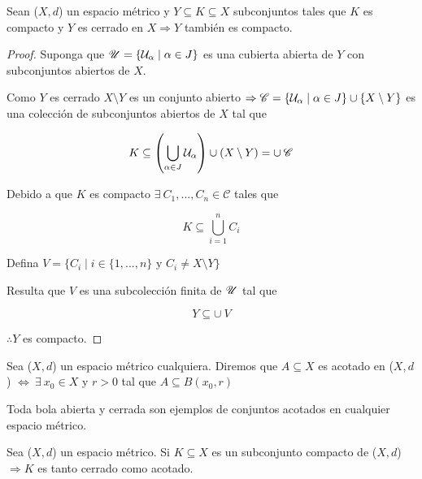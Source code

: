 \begin{theorem} \label{theomhb}
    Sean ($X,d$) un espacio métrico y $Y \subseteq K \subseteq X$ subconjuntos tales que $K$ es compacto y $Y$ es cerrado en $X \Rightarrow Y$ también es compacto. 
\end{theorem}

\begin{proof}
    Suponga que $\mathscr{U} = \{ \mathcal{U}_\alpha \mid \alpha \in J \}$ es una cubierta abierta de $Y$ con subconjuntos abiertos de $X$. 

    Como $Y$ es cerrado $X \setminus Y$ es un conjunto abierto $\Rightarrow \mathscr{C} = \{ \mathcal{U}_\alpha \mid \alpha \in J \} \cup \{ X \setminus Y \}$ es una colección de subconjuntos abiertos de $X$ tal que

    $$K \subseteq \left( \bigcup_{\alpha \in J} \mathcal{U}_\alpha \right) \cup (X \setminus Y) = \cup \:\mathscr{C}$$

    Debido a que $K$ es compacto $\exists \: C_1, ..., C_n \in \mathscr{C}$ tales que

    $$K \subseteq \bigcup_{i=1}^{n} C_i$$

    Defina $V = \{ C_i \mid i \in \{ 1, ..., n \} \text{ y } C_i \neq X \setminus Y \}$

    Resulta que $V$ es una subcolección finita de $\mathscr{U}$ tal que

    $$Y \subseteq \cup \: V$$

    $\therefore Y$ es compacto.
\end{proof}

\begin{definition}
    Sea ($X,d$) un espacio métrico cualquiera. Diremos que $A \subseteq X$ es acotado en ($X,d$) $\iff \: \exists \: x_0 \in X$ y $r > 0$ tal que $A \subseteq B(x_0,r)$ 
\end{definition}

\begin{corollary}
    Toda bola abierta y cerrada son ejemplos de conjuntos acotados en cualquier espacio métrico.
\end{corollary}

\begin{theorem}
    Sea ($X,d$) un espacio métrico. Si $K \subseteq X$ es un subconjunto compacto de ($X,d$) $\Rightarrow K$ es tanto cerrado como acotado. 
\end{theorem}

